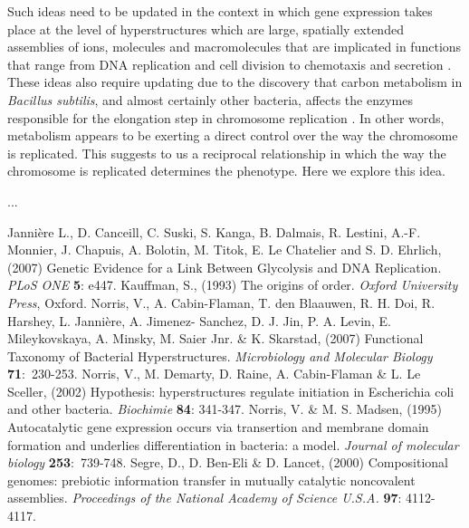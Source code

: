 \documentclass[11pt,a4paper,twoside]{epig}
\begin{document}
\vspace{3mm}

Such ideas need to be updated in the context in which gene expression takes place at the level
of hyperstructures which are large, spatially extended assemblies of ions, molecules and
macromolecules that are implicated in functions that range from DNA replication and cell
division to chemotaxis and secretion \cite{23}. These ideas also require updating due to the
discovery that carbon metabolism in \emph{Bacillus subtilis}, and almost certainly other
bacteria, affects the enzymes responsible for the elongation step in chromosome replication
\cite{39}. In other words, metabolism appears to be exerting a direct control over the
way the chromosome is replicated. This suggests to us a reciprocal relationship in which the
way the chromosome is replicated determines the phenotype. Here we explore this idea.

\vspace{3mm}
\noindent
...


\begin{thebibliography}{10}

 Jannière L., D. Canceill, C. Suski, S. Kanga, B. Dalmais, R. Lestini, A.-F. Monnier, J. Chapuis, A. Bolotin,  M. Titok, E. Le Chatelier and S. D. Ehrlich, (2007) Genetic Evidence for a Link Between Glycolysis and DNA Replication. \emph{PLoS ONE} \textbf{5}: e447.
 Kauffman, S., (1993) The origins of order. \emph{Oxford University Press}, Oxford.
 Norris, V., A. Cabin-Flaman, T. den Blaauwen, R. H. Doi, R. Harshey, L. Jannière, A. Jimenez- Sanchez, D. J. Jin, P. A. Levin, E. Mileykovskaya, A. Minsky, M. Saier Jnr. \& K. Skarstad, (2007) Functional Taxonomy of Bacterial Hyperstructures. \emph{Microbiology and Molecular Biology} \textbf{71}:~230-253.
 Norris, V., M. Demarty, D. Raine, A. Cabin-Flaman \& L. Le Sceller, (2002) Hypothesis: hyperstructures regulate initiation in Escherichia coli and other bacteria. \emph{Biochimie} \textbf{84}: 341-347.
 Norris, V. \& M. S. Madsen, (1995) Autocatalytic gene expression occurs via transertion and membrane domain formation and underlies differentiation in bacteria: a model. \emph{Journal of molecular biology} \textbf{253}:~739-748.
 Segre, D., D. Ben-Eli \& D. Lancet, (2000) Compositional genomes: prebiotic information transfer in mutually catalytic noncovalent assemblies. \emph{Proceedings of the National Academy of Science U.S.A.} \textbf{97}: 4112-4117.

\end{thebibliography}
\end{document}
